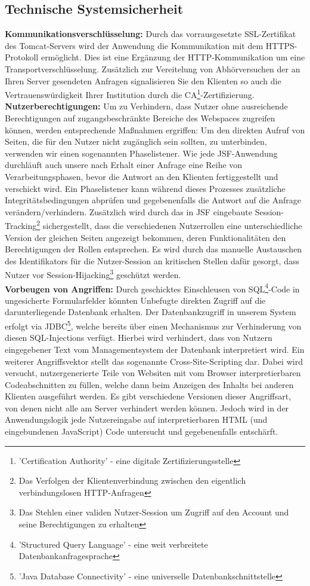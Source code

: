 \documentclass{article}
\begin{document}
\subsection{Technische Systemsicherheit}
\noindent \textbf{Kommunikationsverschlüsselung:} Durch das vorrausgesetzte SSL-Zertifikat des Tomcat-Servers wird der Anwendung die Kommunikation mit dem HTTPS-Protokoll ermöglicht. Dies ist eine Ergänzung der HTTP-Kommunikation um eine Transportverschlüsselung. Zusätzlich zur Vereitelung von Abhörversuchen der an Ihren Server gesendeten Anfragen signalisieren Sie den Klienten so auch die Vertrauenswürdigkeit Ihrer Institution durch die CA\footnote{'Certification Authority' - eine digitale Zertifizierungsstelle}-Zertifizierung.\\
\textbf{Nutzerberechtigungen:} Um zu Verhindern, dass Nutzer ohne ausreichende Berechtigungen auf zugangsbeschränkte Bereiche des Webspaces zugreifen können, werden entsprechende Maßnahmen ergriffen: Um den direkten Aufruf von Seiten, die für den Nutzer nicht zugänglich sein sollten, zu unterbinden, verwenden wir einen sogenannten Phaselistener. Wie jede JSF-Anwendung durchläuft auch unsere nach Erhalt einer Anfrage eine Reihe von Verarbeitungsphasen, bevor die Antwort an den Klienten fertiggestellt und verschickt wird. Ein Phaselistener kann während dieses Prozesses zusätzliche Integritätsbedingungen abprüfen und gegebenenfalls die Antwort auf die Anfrage verändern/verhindern. Zusätzlich wird durch das in JSF eingebaute Session-Tracking\footnote{Das Verfolgen der Klientenverbindung zwischen den eigentlich verbindungslosen HTTP-Anfragen} sichergestellt, dass die verschiedenen Nutzerrollen eine unterschiedliche Version der gleichen Seiten angezeigt bekommen, deren Funktionalitäten den Berechtigungen der Rollen entsprechen. Es wird durch das manuelle Austauschen des Identifikators für die Nutzer-Session an kritischen Stellen dafür gesorgt, dass Nutzer vor Session-Hijacking\footnote{Das Stehlen einer validen Nutzer-Session um Zugriff auf den Account und seine Berechtigungen zu erhalten} geschützt werden.\\
\textbf{Vorbeugen von Angriffen:} Durch geschicktes Einschleusen von SQL\footnote{'Structured Query Language' - eine weit verbreitete Datenbankanfragesprache}-Code in ungesicherte Formularfelder könnten Unbefugte direkten Zugriff auf die darunterliegende Datenbank erhalten. Der Datenbankzugriff in unserem System erfolgt via JDBC\footnote{'Java Database Connectivity' - eine universelle Datenbankschnittstelle}, welche bereits über einen Mechanismus zur Verhinderung von diesen SQL-Injections verfügt. Hierbei wird verhindert, dass von Nutzern eingegebener Text vom Managementsystem der Datenbank interpretiert wird. Ein weiterer Angriffsvektor stellt das sogenannte Cross-Site-Scripting dar. Dabei wird versucht, nutzergenerierte Teile von Websiten mit vom Browser interpretierbaren Codeabschnitten zu füllen, welche dann beim Anzeigen des Inhalts bei anderen Klienten ausgeführt werden. Es gibt verschiedene Versionen dieser Angriffsart, von denen nicht alle am Server verhindert werden können. Jedoch wird in der Anwendungslogik jede Nutzereingabe auf interpretierbaren HTML (und eingebundenen JavaScript) Code untersucht und gegebenenfalls entschärft.
\end{document}
